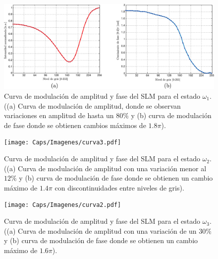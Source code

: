 
\begin{figure}[!ht]
  \centering
    \includegraphics[width=\textwidth,keepaspectratio]{Caps/Imagenes/curva1.pdf}
  \caption[Curva de modulación de amplitud y fase del SLM para el estado $\omega_1$.]{Curva de modulación de amplitud y fase del SLM para el estado $\omega_1$. ((a) Curva de modulación de amplitud, donde se observan variaciones en amplitud de hasta un $80\%$ y (b) curva de modulación de fase donde se obtienen cambios máximos de $1.8\pi$).}
  \label{fig:curva1}
\end{figure}

\begin{figure}[!ht]
  \centering
    \texttt{[image: Caps/Imagenes/curva3.pdf]}
  \caption[Curva de modulación de amplitud y fase del SLM para el estado $\omega_2$.]{Curva de modulación de amplitud y fase del SLM para el estado $\omega_2$. ((a) Curva de modulación de amplitud con una variación menor al $12\%$ y (b) curva de modulación de fase donde se obtienen un cambio máximo de $1.4\pi$ con discontinuidades entre niveles de gris).}
  \label{fig:curva3}
\end{figure}

\begin{figure}[!ht]
  \centering
    \texttt{[image: Caps/Imagenes/curva2.pdf]}
  \caption[Curva de modulación de amplitud y fase del SLM para el estado $\omega_3$.]{Curva de modulación de amplitud y fase del SLM para el estado $\omega_3$. ((a) Curva de modulación de amplitud con una variación de un $30\%$ y (b) curva de modulación de fase donde se obtienen un cambio máximo de $1.6\pi$).}
  \label{fig:curva2}
\end{figure}

